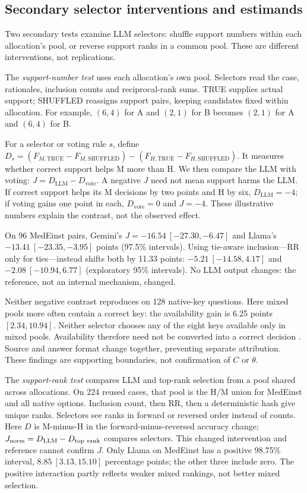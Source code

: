 \subsection{Secondary selector interventions and estimands}\label{app:selector_detail}

Two secondary tests examine LLM selectors: shuffle support numbers within each allocation's pool, or reverse support ranks in a common pool. These are different interventions, not replications.

The \emph{support-number test} uses each allocation's own pool. Selectors read the case, rationales, inclusion counts and reciprocal-rank sums. TRUE supplies actual support; SHUFFLED reassigns support pairs, keeping candidates fixed within allocation. For example, $(6,4)$ for A and $(2,1)$ for B becomes $(2,1)$ for A and $(6,4)$ for B.

For a selector or voting rule $s$, define $D_s=(F_{M,\mathrm{TRUE}}-F_{M,\mathrm{SHUFFLED}})-(F_{H,\mathrm{TRUE}}-F_{H,\mathrm{SHUFFLED}})$. It measures whether correct support helps M more than H. We then compare the LLM with voting: $J=D_{\mathrm{LLM}}-D_{\mathrm{vote}}$. A negative $J$ need not mean support harms the LLM. If correct support helps its M decisions by two points and H by six, $D_{\mathrm{LLM}}=-4$; if voting gains one point in each, $D_{\mathrm{vote}}=0$ and $J=-4$. These illustrative numbers explain the contrast, not the observed effect.

On 96 MedEinst pairs, Gemini's $J=-16.54\ [-27.30,-6.47]$ and Llama's $-13.41\ [-23.35,-3.95]$ points (97.5\% intervals). Using tie-aware inclusion---RR only for ties---instead shifts both by 11.33 points: $-5.21\ [-14.58,4.17]$ and $-2.08\ [-10.94,6.77]$ (exploratory 95\% intervals). No LLM output changes: the reference, not an internal mechanism, changed.

Neither negative contrast reproduces on 128 native-key questions. Here mixed pools more often contain a correct key: the availability gain is 6.25 points $[2.34,10.94]$. Neither selector chooses any of the eight keys available only in mixed pools. Availability therefore need not be converted into a correct decision \citep{chen2026routinggap}. Source and answer format change together, preventing separate attribution. These findings are supporting boundaries, not confirmation of $C$ or $\theta$.

The \emph{support-rank test} compares LLM and top-rank selection from a pool shared across allocations. On 224 reused cases, that pool is the H/M union for MedEinst and all native options. Inclusion count, then RR, then a deterministic hash give unique ranks. Selectors see ranks in forward or reversed order instead of counts. Here $D$ is M-minus-H in the forward-minus-reversed accuracy change; $J_{\rm norm}=D_{\mathrm{LLM}}-D_{\mathrm{top\ rank}}$ compares selectors. This changed intervention and reference cannot confirm $J$. Only Llama on MedEinst has a positive 98.75\% interval, $8.85\ [3.13,15.10]$ percentage points; the other three include zero. The positive interaction partly reflects weaker mixed rankings, not better mixed selection.

